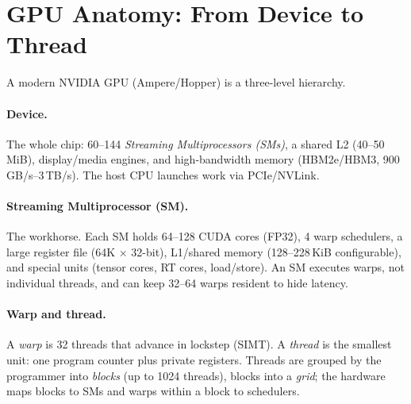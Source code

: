 \section{GPU Anatomy: From Device to Thread}
\label{sec:anatomy}
A modern NVIDIA GPU (Ampere/Hopper) is a three-level hierarchy.

\paragraph{Device.} The whole chip: 60--144 \emph{Streaming Multiprocessors (SMs)}, a shared L2 (40--50\,MiB), display/media engines, and high-bandwidth memory (HBM2e/HBM3, 900\,GB/s--3\,TB/s). The host CPU launches work via PCIe/NVLink.

\paragraph{Streaming Multiprocessor (SM).} The workhorse. Each SM holds 64--128 CUDA cores (FP32), 4 warp schedulers, a large register file (64K $\times$ 32-bit), L1/shared memory (128--228\,KiB configurable), and special units (tensor cores, RT cores, load/store). An SM executes warps, not individual threads, and can keep 32--64 warps resident to hide latency.

\paragraph{Warp and thread.} A \emph{warp} is 32 threads that advance in lockstep (SIMT). A \emph{thread} is the smallest unit: one program counter plus private registers. Threads are grouped by the programmer into \emph{blocks} (up to 1024 threads), blocks into a \emph{grid}; the hardware maps blocks to SMs and warps within a block to schedulers.

